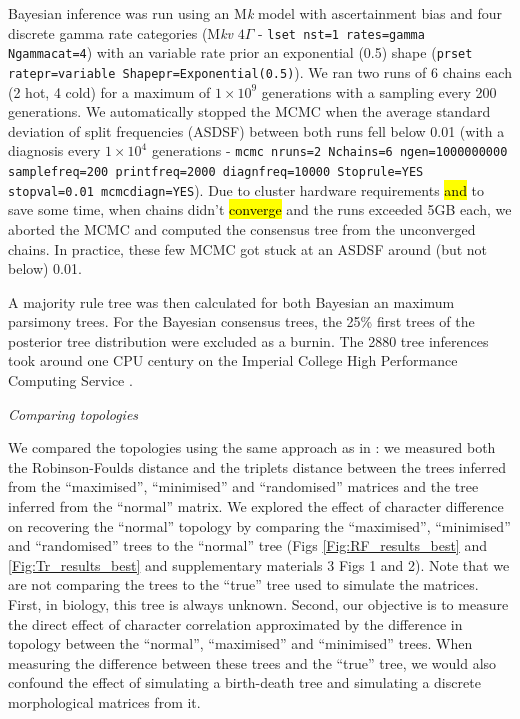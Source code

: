 \documentclass[12pt,letterpaper]{article}
\renewcommand{\subsection}[1]{%
\bigskip
\begin{center}
\begin{large}
\normalfont\itshape #1
\end{large}
\end{center}}
\begin{document}
Bayesian inference was run using an M\textit{k} model with ascertainment bias and four discrete gamma rate categories (M\textit{kv} $4\Gamma$ - \texttt{lset nst=1 rates=gamma Ngammacat=4}) with an variable rate prior an exponential (0.5) shape (\texttt{prset ratepr=variable Shapepr=Exponential(0.5)}).
We ran two runs of 6 chains each (2 hot, 4 cold) for a maximum of $1\times10^9$ generations with a sampling every 200 generations.
We automatically stopped the MCMC when the average standard deviation of split frequencies (ASDSF) between both runs fell below 0.01 (with a diagnosis every $1\times10^4$ generations - \texttt{mcmc nruns=2 Nchains=6 ngen=1000000000 samplefreq=200 printfreq=2000 diagnfreq=10000 Stoprule=YES stopval=0.01 mcmcdiagn=YES}).
Due to cluster hardware requirements \hl{and} to save some time, when chains didn't \hl{converge} and the runs exceeded 5GB each, we aborted the MCMC and computed the consensus tree from the unconverged chains.
In practice, these few MCMC got stuck at an ASDSF around (but not below) 0.01.

A majority rule tree was then calculated for both Bayesian an maximum parsimony trees.
For the Bayesian consensus trees, the 25\% first trees of the posterior tree distribution were excluded as a burnin.
The 2880 tree inferences took around one CPU century on the Imperial College High Performance Computing Service \citep[2-3GHz clock rate;][]{HPC}.

\subsection{Comparing topologies}
We compared the topologies using the same approach as in \cite{Guillerme2016146}: we measured both the Robinson-Foulds distance \citep{RF1981} and the triplets distance \citep{dobson1975triplets} between the trees inferred from the ``maximised'', ``minimised'' and ``randomised'' matrices and the tree inferred from the ``normal'' matrix.
We explored the effect of character difference on recovering the ``normal'' topology by comparing the ``maximised'', ``minimised'' and ``randomised'' trees to the ``normal'' tree (Figs \ref{Fig:RF_results_best} and \ref{Fig:Tr_results_best} and supplementary materials 3 Figs 1 and 2).
Note that we are not comparing the trees to the ``true'' tree used to simulate the matrices.
First, in biology, this tree is always unknown.
Second, our objective is to measure the direct effect of character correlation approximated by the difference in topology between the ``normal'', ``maximised'' and ``minimised'' trees.
When measuring the difference between these trees and the ``true'' tree, we would also confound the effect of simulating a birth-death tree and simulating a discrete morphological matrices from it.
\end{document}
